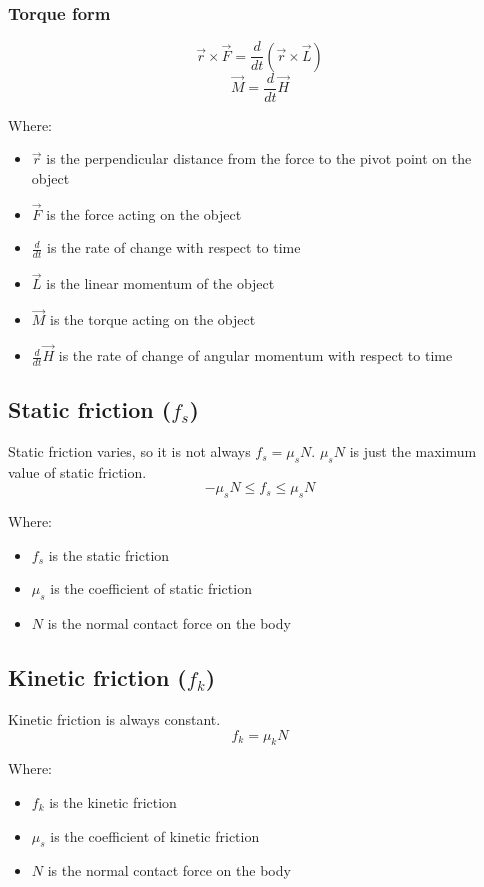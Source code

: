 \documentclass[11pt]{article}
\begin{document}
\subsubsection{Torque form}
\label{sec:org6a337e8}
\[\vec{r} \times \vec{F} = \frac{d}{dt} \left(\vec{r} \times \vec{L} \right)\]
\[\vec{M} = \frac{d}{dt} \vec{H}\]

Where:
\begin{itemize}
\item \(\vec{r}\) is the perpendicular distance from the force to the pivot point on the object
\item \(\vec{F}\) is the force acting on the object
\item \(\frac{d}{dt}\) is the rate of change with respect to time
\item \(\vec{L}\) is the linear momentum of the object
\item \(\vec{M}\) is the torque acting on the object
\item \(\frac{d}{dt} \vec{H}\) is the rate of change of angular momentum with respect to time
\end{itemize}

\subsection{Static friction (\(f_s\))}
\label{sec:orga6c111e}
Static friction varies, so it is not always \(f_s = \mu_s N\).
\(\mu_s N\) is just the maximum value of static friction.
\[-\mu_s N \le f_s \le \mu_s N\]

Where:
\begin{itemize}
\item \(f_s\) is the static friction
\item \(\mu_s\) is the coefficient of static friction
\item \(N\) is the normal contact force on the body
\end{itemize}

\subsection{Kinetic friction (\(f_k\))}
\label{sec:org2563b5e}
Kinetic friction is always constant.
\[f_k = \mu_k N\]

Where:
\begin{itemize}
\item \(f_k\) is the kinetic friction
\item \(\mu_s\) is the coefficient of kinetic friction
\item \(N\) is the normal contact force on the body
\end{itemize}
\end{document}
